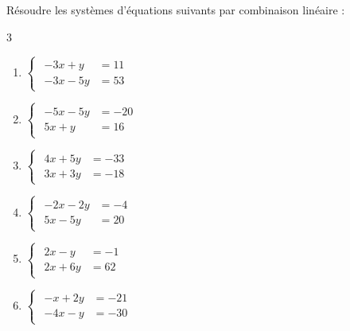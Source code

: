 {%
\begin{Exercice}
Résoudre les systèmes d'équations suivants par combinaison linéaire :
\begin{multicols}{3}
\begin{enumerate}[itemsep=1em]
	\item \begin{minipage}[t]{\linewidth} $\begin{cases}\begin{aligned}-3x+y &=11\\-3x-5y &=53\end{aligned}\end{cases}$\end{minipage}
	\item \begin{minipage}[t]{\linewidth} $\begin{cases}\begin{aligned}-5x-5y &=-20\\5x+y &=16\end{aligned}\end{cases}$\end{minipage}
	\item \begin{minipage}[t]{\linewidth} $\begin{cases}\begin{aligned}4x+5y &=-33\\3x+3y &=-18\end{aligned}\end{cases}$\end{minipage}
	\item \begin{minipage}[t]{\linewidth} $\begin{cases}\begin{aligned}-2x-2y &=-4\\5x-5y &=20\end{aligned}\end{cases}$\end{minipage}
	\item \begin{minipage}[t]{\linewidth} $\begin{cases}\begin{aligned}2x-y &=-1\\2x+6y &=62\end{aligned}\end{cases}$\end{minipage}
	\item \begin{minipage}[t]{\linewidth} $\begin{cases}\begin{aligned}-x+2y &=-21\\-4x-y &=-30\end{aligned}\end{cases}$\end{minipage}
\end{enumerate}
\end{multicols}
\end{Exercice}

}
